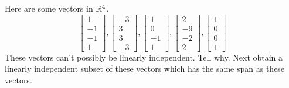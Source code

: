 \documentclass{ximera}
\begin{document}
\begin{problem}\label{prb:3.34} Here are some vectors in $\mathbb{R}^{4}$.
\begin{equation*}
\left[
\begin{array}{r}
1 \\
-1 \\
-1 \\
1
\end{array}
\right] ,\left[
\begin{array}{r}
-3 \\
3 \\
3 \\
-3
\end{array}
\right] ,\left[
\begin{array}{r}
1 \\
0 \\
-1 \\
1
\end{array}
\right] ,\left[
\begin{array}{r}
2 \\
-9 \\
-2 \\
2
\end{array}
\right] ,\left[
\begin{array}{r}
1 \\
0 \\
0 \\
1
\end{array}
\right]
\end{equation*}
These vectors can't possibly be linearly independent. Tell why. Next obtain a
linearly independent subset of these vectors which has the same span as
these vectors. 
\end{problem}
\end{document}
